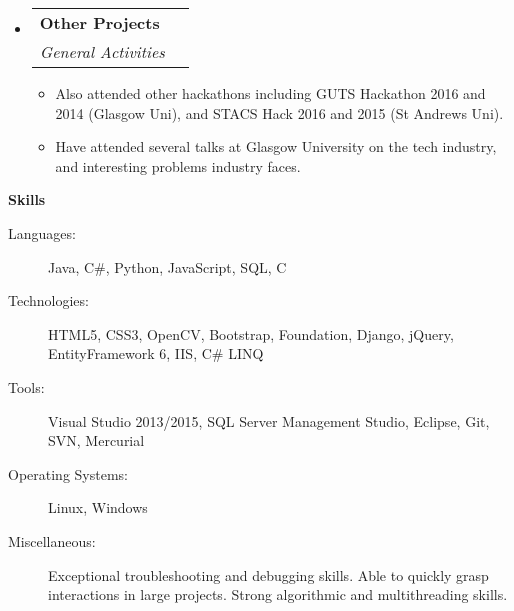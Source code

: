 \documentclass[letterpaper,11pt]{article}
\makeatletter
\newcommand{\resitem}[1]{\item #1 \vspace{-2pt}}
\newcommand{\resheading}[1]{{\large \colorbox{mygrey}{\begin{minipage}{\textwidth}{\textbf{#1 \vphantom{p\^{E}}}}\end{minipage}}}}
\newcommand{\ressubheading}[4]{
\begin{tabular*}{7.0in}{l@{\extracolsep{\fill}}r}
	\textbf{#1} & #2 \\
	\textit{#3} & \textit{#4} \\
\end{tabular*}\vspace{-6pt}}
\makeatother
\begin{document}
\begin{itemize}
		\item
		\ressubheading{Other Projects}{}
		{General Activities}{}
		\begin{itemize}
			\resitem{Also attended other hackathons including GUTS Hackathon 2016 and 2014 (Glasgow Uni), and STACS Hack 2016 and 2015 (St Andrews Uni).}
			\resitem{Have attended several talks at Glasgow University on the tech industry, and interesting problems industry faces.}
		\end{itemize}

	\end{itemize}

	\resheading{Skills}
	\begin{description}
		\item[Languages:]
		Java, C\#, Python, JavaScript, SQL, C

		\item[Technologies:]
		HTML5, CSS3, OpenCV, Bootstrap, Foundation, Django, jQuery, EntityFramework 6, IIS, C\# LINQ

		\item[Tools:]
		Visual Studio 2013/2015, SQL Server Management Studio, Eclipse, Git, SVN, Mercurial

		\item[Operating Systems:]
		Linux, Windows

		\item[Miscellaneous:]
		Exceptional troubleshooting and debugging skills. Able to quickly grasp interactions in large projects.
		Strong algorithmic and multithreading skills.
	\end{description}
\end{document}
